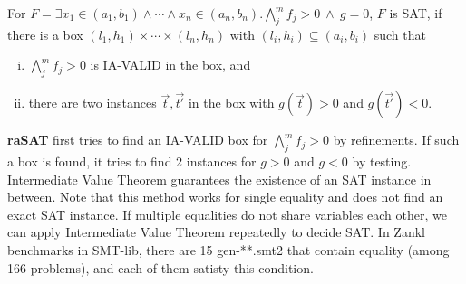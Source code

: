 \documentclass[runningheads,a4paper,oribibl]{llncs}
\begin{document}
\begin{lemma} \label{lemma:ivt}
For $F = \exists x_1 \in (a_1,b_1) \wedge \cdots \wedge x_n \in (a_n,b_n). 
\bigwedge \limits_{j}^m f_j > 0~\wedge~g = 0$, $F$ is SAT, if 
there is a box $(l_1, h_1) \times \cdots \times (l_n,h_n)$ with $ (l_i,h_i) \subseteq (a_i,b_i)$ 
such that 
\begin{enumerate}[(i)]
\item $\bigwedge \limits_{j}^m f_j > 0$ is IA-VALID in the box, and 
\item there are two instances $\vec{t},\vec{t'}$ in the box with $g(\vec{t}) > 0$ and $g(\vec{t'}) < 0$.
\end{enumerate}
\end{lemma}

{\bf raSAT} first tries to find an IA-VALID box for $\bigwedge \limits_{j}^m f_j > 0$ by refinements. 
If such a box is found, it tries to find 2 instances for $g > 0$ and $g < 0$ by testing. 
Intermediate Value Theorem guarantees the existence of an SAT instance in between. 
Note that this method works for single equality and does not find an exact SAT instance. 
If multiple equalities do not share variables each other, we can apply Intermediate Value Theorem 
repeatedly to decide SAT. In Zankl benchmarks in SMT-lib, there are 15 gen-**.smt2 that contain equality
(among 166 problems), and each of them satisty this condition. 
\end{document}
